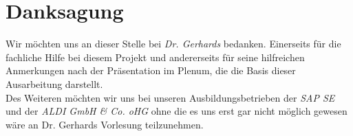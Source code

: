 \documentclass[10pt,twocolumn]{scrartcl}
\begin{document}
% 



\section*{Danksagung}
Wir möchten uns an dieser Stelle bei \emph{Dr. Gerhards} bedanken. Einerseits für die fachliche Hilfe bei diesem Projekt und andererseits für seine hilfreichen Anmerkungen nach der Präsentation im Plenum, die die Basis dieser Ausarbeitung darstellt.\\
Des Weiteren möchten wir uns bei unseren Ausbildungsbetrieben der \emph{SAP SE} und der \emph{ALDI GmbH \& Co. oHG} ohne die es uns erst gar nicht möglich gewesen wäre an Dr. Gerhards Vorlesung teilzunehmen.
\end{document}
